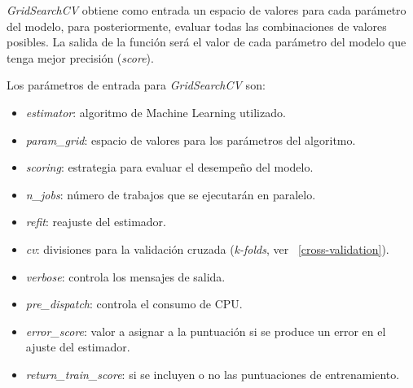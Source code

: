\documentclass[12pt,a4paper,Spanish]{article}
\begin{document}
\textit{GridSearchCV} obtiene como entrada un espacio de valores para cada parámetro del modelo, para posteriormente, evaluar todas las combinaciones de valores posibles. La salida de la función será el valor de cada parámetro del modelo que tenga mejor precisión (\textit{score}).
\newline

Los parámetros de entrada para \textit{GridSearchCV} son:
\begin{itemize}
	\item \textit{estimator}: algoritmo de Machine Learning utilizado.
	\item \textit{param\_grid}: espacio de valores para los parámetros del algoritmo.
	\item \textit{scoring}: estrategia para evaluar el desempeño del modelo.
	\item \textit{n\_jobs}: número de trabajos que se ejecutarán en paralelo.
	\item \textit{refit}: reajuste del estimador.
	\item \textit{cv}: divisiones para la validación cruzada (\textit{k-folds}, ver ~\ref{cross-validation}).
	\item \textit{verbose}: controla los mensajes de salida.
	\item \textit{pre\_dispatch}: controla el consumo de CPU.
	\item \textit{error\_score}: valor a asignar a la puntuación si se produce un error en el ajuste del estimador.
	\item \textit{return\_train\_score}: si se incluyen o no las puntuaciones de entrenamiento.
\end{itemize}
\end{document}
